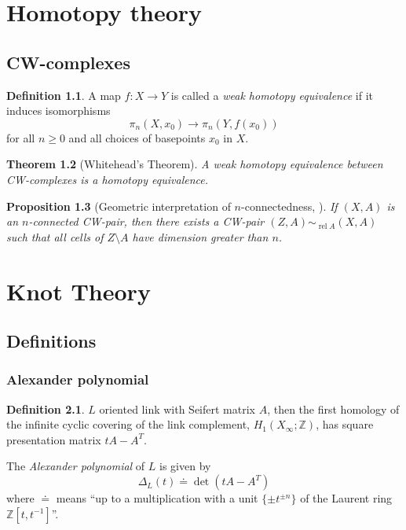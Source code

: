 \documentclass[a4paper]{book}
\newtheorem{theorem}{Theorem}[section]
\newtheorem{proposition}[theorem]{Proposition}
\theoremstyle{definition}
\newtheorem{definition}[theorem]{Definition}
\theoremstyle{remark}
\DeclareMathOperator{\rel}{rel}
\newcommand{\Z}{\mathbb{Z}}
\begin{document}
\chapter{Homotopy theory}

\section{CW-complexes}

\begin{definition}
	A map $f \colon X \rightarrow Y$ is called a
	\textit{weak homotopy equivalence} 
	if it induces isomorphisms
	\[
		\pi_n(X, x_0) \rightarrow \pi_n(Y, f(x_0))
	\]
	for all $n \ge 0$ and all choices of basepoints $x_0$ in $X$.
\end{definition}

\begin{theorem}[Whitehead's Theorem]
	A weak homotopy equivalence between CW-complexes is a homotopy equivalence.
\end{theorem}

\begin{proposition}[Geometric interpretation of $n$-connectedness, {\cite[Proposition 4.15]{hatcher2002algebraic}}]
	If $(X, A)$ is an $n$-connected CW-pair, then there exists
	a CW-pair $(Z, A) \sim_{\rel A} (X, A)$
	such that all cells of $Z \setminus A$ have dimension greater than $n$.
\end{proposition}


\chapter{Knot Theory}

\section{Definitions}

\subsection{Alexander polynomial}

\begin{definition}
	$L$ oriented link with Seifert matrix $A$, then the first homology of
	the infinite cyclic covering of the link complement, $H_1(X_{\infty} ; \Z)$,
	has square presentation matrix $t A - A^{T}$.
	
	The \textit{Alexander polynomial} of $L$ is given by
	\begin{equation*}
		\Delta_{L}(t) \doteq \det(t A - A^{T})
	\end{equation*}
	where $\doteq$ means ``up to a multiplication with a unit $\{ \pm t^{\pm n} \}$
	of the Laurent ring $\Z[t, t^{-1}]$''.
\end{definition}
\end{document}
